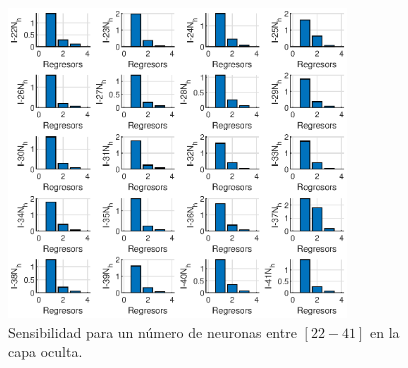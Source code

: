 \documentclass[12pt]{article}
\begin{document}
\begin{itemize}
\begin{figure}[t!]
		 \includegraphics[width=0.8\textwidth]{imag/redes/sensibilidad_full_2_3.eps}
		\caption{Sensibilidad para un número de neuronas entre $[22-41]$ en la capa oculta.}
		\label{sensi_red_2_3}
	\end{figure}
\end{itemize}
\end{document}
